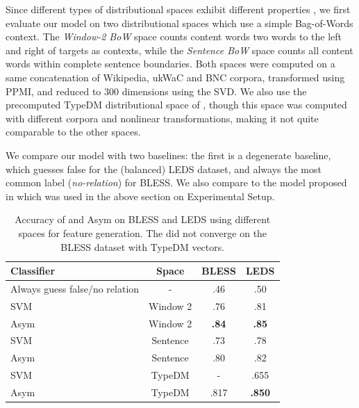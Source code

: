 Since different types of distributional spaces exhibit different properties
\cite{peirsman:2008:essli,agirre:2009:naacl,baroni:2011:gems}, we first
evaluate our model on two distributional spaces which use a simple Bag-of-Words
context.  The {\em Window-2 BoW} space counts content words two words to the
left and right of targets as contexts, while the {\em Sentence BoW} space
counts all content words within complete sentence boundaries. Both spaces were
computed on a same concatenation of Wikipedia, ukWaC and BNC corpora,
transformed using PPMI, and reduced to 300 dimensions using the SVD. We also
use the precomputed TypeDM distributional space of ,
though this space was computed with different corpora and nonlinear
transformations, making it not quite comparable to the other spaces.

We compare our model with two baselines: the first is a degenerate baseline,
which guesses false for the (balanced) LEDS dataset, and always
the most common label ({\em no-relation}) for BLESS. We also compare to the
model proposed in  which was used in the above
section on Experimental Setup.

\begin{table}
  \centering
  \begin{tabular}{|lc|cc|}
    \hline
    {\bf Classifier}                      &{\bf Space}& {\bf BLESS}  & {\bf LEDS} \\
    \hline
    \hline
    Always guess false/no relation        &   -       &      .46     &      .50   \\
    \hline
    SVM \cite{baroni:2012:eacl}           & Window 2  &      .76     &      .81   \\
    Asym \cite{roller:2014:coling}        & Window 2  & {\bf .84    }& {\bf .85}  \\
    \hline
    SVM                                   & Sentence  &      .73     &      .78   \\
    Asym                                  & Sentence  &      .80     &      .82   \\
    \hline
    SVM                                   & TypeDM    &        -     &      .655  \\
    Asym                                  & TypeDM    &      .817    & {\bf .850} \\
    \hline
  \end{tabular}
  \caption{Accuracy of  and Asym on BLESS and LEDS
    using different spaces for feature generation. The
     did not converge on the BLESS dataset with
    TypeDM vectors.}
  \label{tab:asymspaces}
\end{table}

